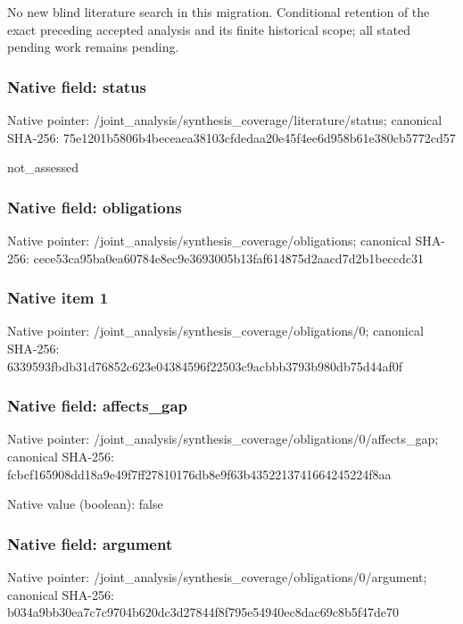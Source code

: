 \documentclass[10pt,a4paper]{article}
\begin{document}
\begingroup\raggedright\sloppy No new blind literature search in this migration. Conditional retention of the exact preceding accepted analysis and its finite historical scope;\allowbreak{} all stated pending work remains pending.\par\endgroup

\subsubsection{Native field: status}
Native pointer: /joint\_\allowbreak{}analysis/synthesis\_\allowbreak{}coverage/literature/status; canonical SHA-256: 75e1201b5806b4beceaea38103cfdedaa20e45f4ee6d958b61e380cb5772cd57

\begingroup\raggedright\sloppy not\_\allowbreak{}assessed\par\endgroup

\subsubsection{Native field: obligations}
Native pointer: /joint\_\allowbreak{}analysis/synthesis\_\allowbreak{}coverage/obligations; canonical SHA-256: cece53ca95ba0ea60784e8ec9e3693005b13faf614875d2aacd7d2b1beccdc31

\subsubsection{Native item 1}
Native pointer: /joint\_\allowbreak{}analysis/synthesis\_\allowbreak{}coverage/obligations/0; canonical SHA-256: 6339593fbdb31d76852c623e04384596f22503c9acbbb3793b980db75d44af0f

\subsubsection{Native field: affects\_\allowbreak{}gap}
Native pointer: /joint\_\allowbreak{}analysis/synthesis\_\allowbreak{}coverage/obligations/0/affects\_\allowbreak{}gap; canonical SHA-256: fcbcf165908dd18a9e49f7ff27810176db8e9f63b4352213741664245224f8aa

Native value (boolean): false

\subsubsection{Native field: argument}
Native pointer: /joint\_\allowbreak{}analysis/synthesis\_\allowbreak{}coverage/obligations/0/argument; canonical SHA-256: b034a9bb30ea7c7c9704b620dc3d27844f8f795e54940ec8dac69c8b5f47de70
\end{document}
